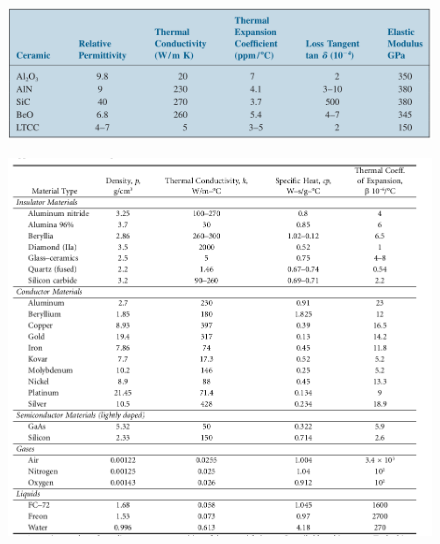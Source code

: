 \documentclass[final]{cubedoc}
\begin{document}
	\begin{figure}[h!]
		\centering
		\includegraphics[width=\linewidth]{docs/table_ceramics_bible.png}
		\caption{\cite[p.718]{tummala2001fundamentals}}
		\label{fig:my_label}
	\end{figure}
	
	
	
	\begin{figure}[h!]
		\centering
		\includegraphics[width=\linewidth]{docs/table_properties_blackwell_handbook.png}
		\caption{\cite[p.408]{blackwell2017electronic}}
		\label{fig:springer_properties}
	\end{figure}
	
\end{document}
